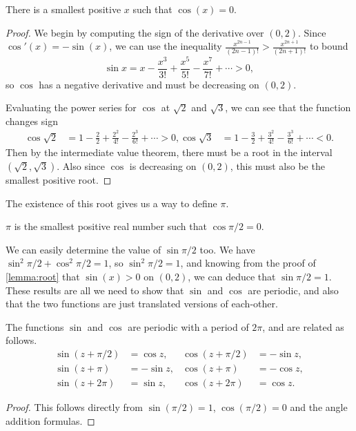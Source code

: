\documentclass[a4paper]{scrartcl}
\begin{document}
\begin{lemma}\label{lemma:root}
	There is a smallest positive $x$ such that $\cos(x) = 0$.
\end{lemma}
\begin{proof}
	We begin by computing the sign of the derivative over $(0, 2)$.
	Since $\cos'(x) = -\sin(x)$, we can use the inequality $\frac{x^{2n - 1}}{(2n - 1)!} > \frac{x^{2n + 1}}{(2n + 1)!}$ to bound
	$$
	\sin x = x - \frac{x^3}{3!} + \frac{x^5}{5!} - \frac{x^7}{7!} + \cdots > 0,
	$$
	so $\cos$ has a negative derivative and must be decreasing on $(0, 2)$.


	Evaluating the power series for $\cos$ at $\sqrt{2}$ and $\sqrt{3}$, we can see that the function changes sign
\begin{align*}
	\cos \sqrt{2} &= 1 - \frac{2}{2} + \frac{2^2}{4!} - \frac{2^3}{6!} +  \cdots > 0, 
	\cos \sqrt{3} &= 1 - \frac{3}{2} + \frac{3^2}{4!} - \frac{3^3}{6!} + \cdots < 0.
\end{align*}
Then by the intermediate value theorem, there must be a root in the interval $(\sqrt{2}, \sqrt{3})$. Also since $\cos$ is decreasing on $(0, 2)$, this must also be the smallest positive root.
\end{proof}

The existence of this root gives us a way to define $\pi$.

\begin{definition}[$\pi$]
	 $\pi$ is the smallest positive real number such that $\cos \pi/2 = 0$.
\end{definition}

We can easily determine the value of $\sin \pi/2$ too. We have $\sin^2 \pi/2 + \cos^2 \pi/2 = 1$, so $\sin^2 \pi/2 = 1$, and 
knowing from the proof of \autoref{lemma:root} that $\sin(x) > 0$ on $(0, 2)$, we can deduce that $\sin \pi/2 = 1$. These results are all we need to show that $\sin$ and $\cos$ are periodic, and also that the two functions are just translated versions of each-other.

\begin{proposition}
	The functions $\sin$ and $\cos$ are periodic with a period of $2 \pi$, and are related as follows.
	\begin{align*}
			\sin (z+ \pi/2)& =\cos z,   & \cos (z+ \pi/2)&=-\sin z, \\
			\sin (z+\pi)&=-\sin z, & \cos (z+\pi)&=-\cos z, \\
			\sin (z+2 \pi)&=\sin z, & \cos (z+2 \pi)&=\cos z.
	\end{align*}
\end{proposition}
\begin{proof}
	This follows directly from $\sin(\pi/2) = 1$, $\cos(\pi/2) = 0$ and the angle addition formulas.
\end{proof}
\end{document}
